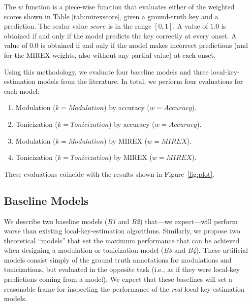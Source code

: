 \documentclass[sigconf]{acmart}
\begin{document}
The $w$ function is a piece-wise function that evaluates either of the weighted scores shown in Table \ref{tab:mirexscore}, given a ground-truth key and a prediction. 
The scalar value $score$ is in the range $[0, 1]$. A value of $1.0$ is obtained if and only if the model predicts the key correctly at every onset. 
A value of $0.0$ is obtained if and only if the model makes incorrect predictions (and for the MIREX weights, also without any partial value) at each onset.

Using this methodology, we evaluate four baseline models and three local-key-estimation models from the literature. 
In total, we perform four evaluations for each model: %
\begin{enumerate}
    \item Modulation ($k=Modulation$) by accuracy ($w=Accuracy$).
    \item Tonicization ($k=Tonicization$) by accuracy ($w=Accuracy$).
    \item Modulation ($k=Modulation$) by MIREX ($w=MIREX$).
    \item Tonicization ($k=Tonicization$) by MIREX ($w=MIREX$).
\end{enumerate}

These evaluations coincide with the results shown in Figure~\ref{fig:plot}.


\subsection{Baseline Models}

We describe two baseline models (\emph{B1} and \emph{B2}) that---we expect---will perform worse than existing local-key-estimation algorithms. 
Similarly, we propose two theoretical ``models'' that set the maximum performance that can be achieved when designing a modulation or tonicization model (\emph{B3} and \emph{B4}). 
These artificial models consist simply of the ground truth annotations for modulations and tonicizations, but evaluated in the opposite task (i.e., as if they were local-key predictions coming from a model). 
We expect that these baselines will set a reasonable frame for inspecting the performance of the \emph{real} local-key-estimation models.
\end{document}
